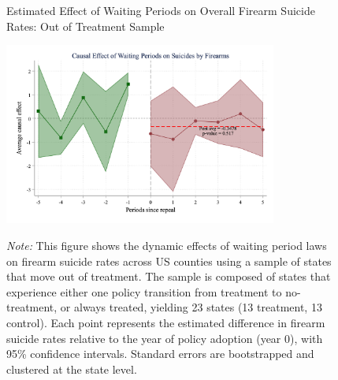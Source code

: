 \begin{figure}[htbp]
    \centering
    \caption{Estimated Effect of Waiting Periods on Overall Firearm Suicide Rates: Out of Treatment Sample}
    \includegraphics[width=0.8\textwidth]{figures/1008-csid-outsample-fire.png}
    \label{fig:firearm_suicide_DID_overall-out}

    \begin{minipage}{\linewidth}
    \caption*{\footnotesize{
      \noindent\textit{Note:} This figure shows the dynamic effects of waiting period laws on firearm suicide rates across US counties using a sample of states that move out of treatment. The sample is composed of states that experience either one policy transition from treatment to no-treatment, or always treated, yielding 23 states (13 treatment, 13 control). Each point represents the estimated difference in firearm suicide rates relative to the year of policy adoption (year 0), with 95\% confidence intervals. Standard errors are bootstrapped and clustered at the state level. 
    }}
  \end{minipage}
\end{figure}

\pagebreak
\clearpage

